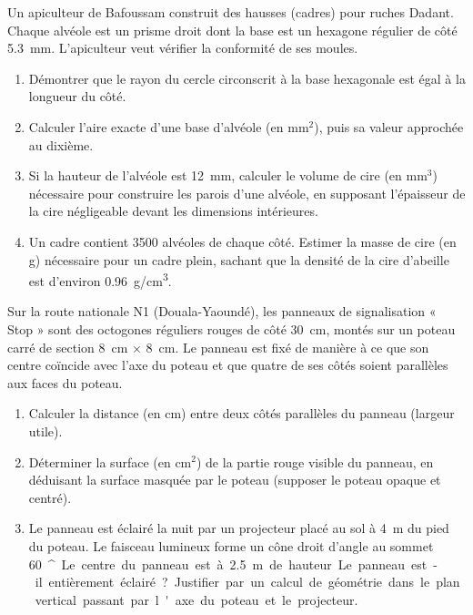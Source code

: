 \documentclass[11pt]{article}
\providecommand{\degree}{^{\circ}}
\begin{document}
\begin{exercice}
Un apiculteur de Bafoussam construit des hausses (cadres) pour ruches Dadant. Chaque alvéole est un prisme droit dont la base est un hexagone régulier de côté \SI{5,3}{mm}. L'apiculteur veut vérifier la conformité de ses moules.
\begin{enumerate}
    \item Démontrer que le rayon du cercle circonscrit à la base hexagonale est égal à la longueur du côté.
    \item Calculer l'aire exacte d'une base d'alvéole (en $\text{mm}^2$), puis sa valeur approchée au dixième.
    \item Si la hauteur de l'alvéole est \SI{12}{mm}, calculer le volume de cire (en $\text{mm}^3$) nécessaire pour construire les parois d'une alvéole, en supposant l'épaisseur de la cire négligeable devant les dimensions intérieures.
    \item Un cadre contient \num{3500} alvéoles de chaque côté. Estimer la masse de cire (en g) nécessaire pour un cadre plein, sachant que la densité de la cire d'abeille est d'environ \SI{0,96}{g/cm^3}.
\end{enumerate}
\end{exercice}

\begin{exercice}
Sur la route nationale N1 (Douala-Yaoundé), les panneaux de signalisation « Stop » sont des octogones réguliers rouges de côté \SI{30}{cm}, montés sur un poteau carré de section \SI{8}{cm} $\times$ \SI{8}{cm}. Le panneau est fixé de manière à ce que son centre coïncide avec l'axe du poteau et que quatre de ses côtés soient parallèles aux faces du poteau.
\begin{enumerate}
    \item Calculer la distance (en cm) entre deux côtés parallèles du panneau (largeur utile).
    \item Déterminer la surface (en $\text{cm}^2$) de la partie rouge visible du panneau, en déduisant la surface masquée par le poteau (supposer le poteau opaque et centré).
    \item Le panneau est éclairé la nuit par un projecteur placé au sol à \SI{4}{m} du pied du poteau. Le faisceau lumineux forme un cône droit d'angle au sommet \SI{60}{\degree}. Le centre du panneau est à \SI{2,5}{m} de hauteur. Le panneau est-il entièrement éclairé ? Justifier par un calcul de géométrie dans le plan vertical passant par l'axe du poteau et le projecteur.
\end{enumerate}
\end{exercice}
\end{document}
